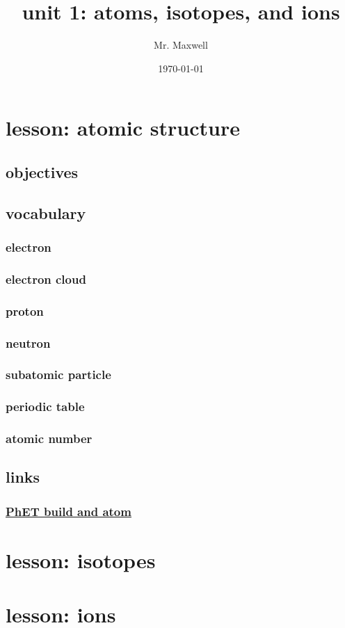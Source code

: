 \documentclass[11pt]{article}
\author{Mr. Maxwell}
\date{\today}
\title{unit 1: atoms, isotopes, and ions}
\begin{document}
\maketitle
\tableofcontents


\section{lesson: atomic structure}
\label{sec:orgee94e52}
\subsection{objectives}
\label{sec:org6e0113f}
\subsection{vocabulary}
\label{sec:org8ac196e}
\subsubsection{electron}
\label{sec:orgaf8a0ce}
\subsubsection{electron cloud}
\label{sec:org675e9cb}
\subsubsection{proton}
\label{sec:org67af8f2}
\subsubsection{neutron}
\label{sec:orgfade568}
\subsubsection{subatomic particle}
\label{sec:org642f8f8}
\subsubsection{periodic table}
\label{sec:org6ce773c}
\subsubsection{atomic number}
\label{sec:org98b76f1}
\subsection{links}
\label{sec:org86a00f8}
\subsubsection{\href{https://phet.colorado.edu/sims/html/build-an-atom/latest/build-an-atom\_all.html}{PhET build and atom}}
\label{sec:orgfa4565e}
\section{lesson: isotopes}
\label{sec:org5c7ac0d}
\section{lesson: ions}
\label{sec:org9ff4771}
\end{document}
